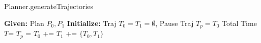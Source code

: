 \begin{algorithm}[ht!]
\caption{Planner.generateTrajectories}
\label{algo:generateTrajs} 
\begin{algorithmic}[1]  
\State \textbf{Given:} Plan $P_{0}, P_{1}$ 
\State \textbf{Initialize:} Traj $T_{0} = T_{1} = \emptyset$, Pause Traj $T_{p} = T_{0}$
\State Total Time $T$= 
\State {}
\State $T_{p}$ = 
\EndIf 
\State $T_{0}$ += 
\State $T_{1}$ += 
\EndProcedure
\State \Return $\{T_{0}, T_{1}\}$
\end{algorithmic}
\end{algorithm}
